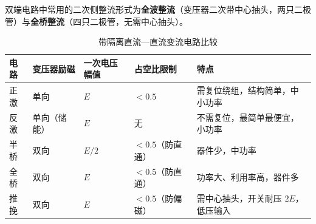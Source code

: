 双端电路中常用的二次侧整流形式为\textbf{全波整流}（变压器二次带中心抽头，两只二极管）与\textbf{全桥整流}（四只二极管，无需中心抽头）。

\begin{table}[htbp]
\centering
\caption{带隔离直流—直流变流电路比较}
\label{tab:5-2}
\begin{tabular}{p{2.4cm}p{2.4cm}p{2.6cm}p{2.0cm}p{4.0cm}}
\toprule
\textbf{电路} & \textbf{变压器励磁} & \textbf{一次电压幅值} & \textbf{占空比限制} & \textbf{特点} \\
\midrule
正激 & 单向 & $E$ & $<0.5$ & 需复位绕组，结构简单，中小功率 \\
反激 & 单向（储能） & $E$ & 无 & 不需复位，最简单最便宜，小功率 \\
半桥 & 双向 & $E/2$ & $<0.5$（防直通） & 器件少，中功率 \\
全桥 & 双向 & $E$ & $<0.5$（防直通） & 功率大、利用率高，器件多 \\
推挽 & 双向 & $E$ & $<0.5$（防偏磁） & 需中心抽头，开关耐压 $2E$，低压输入 \\
\bottomrule
\end{tabular}
\end{table}

